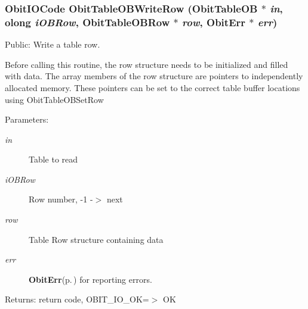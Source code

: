 \subsubsection{\setlength{\rightskip}{0pt plus 5cm}Obit\-IOCode Obit\-Table\-OBWrite\-Row ({\bf Obit\-Table\-OB} $\ast$ {\em in}, {\bf olong} {\em i\-OBRow}, {\bf Obit\-Table\-OBRow} $\ast$ {\em row}, {\bf Obit\-Err} $\ast$ {\em err})}\label{ObitTableOB_8c_a24}


Public: Write a table row. 

Before calling this routine, the row structure needs to be initialized and filled with data. The array members of the row structure are pointers to independently allocated memory. These pointers can be set to the correct table buffer locations using Obit\-Table\-OBSet\-Row \begin{Desc}
\item[Parameters:]
\begin{description}
\item[{\em in}]Table to read \item[{\em i\-OBRow}]Row number, -1 -$>$ next \item[{\em row}]Table Row structure containing data \item[{\em err}]{\bf Obit\-Err}{\rm (p.\,\pageref{structObitErr})} for reporting errors. \end{description}
\end{Desc}
\begin{Desc}
\item[Returns:]return code, OBIT\_\-IO\_\-OK=$>$ OK \end{Desc}
